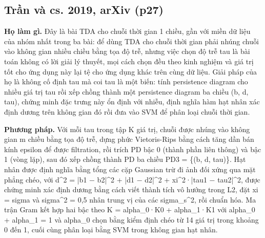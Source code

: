 \documentclass[12pt,a4paper]{article}
\begin{document}
\subsection{Trần và cs. 2019, arXiv \normalfont\small (p27)}
\par\vspace{2pt}
\par\vspace{4pt}
\noindent \textbf{Họ làm gì.} Đây là bài TDA cho chuỗi thời gian 1 chiều, gần với miền dữ liệu của nhóm nhất trong ba bài: để dùng TDA cho chuỗi thời gian phải nhúng chuỗi vào không gian nhiều chiều bằng tọa độ trễ, nhưng việc chọn độ trễ tau là bài toán không có lời giải lý thuyết, mọi cách chọn đều theo kinh nghiệm và giá trị tốt cho ứng dụng này lại tệ cho ứng dụng khác trên cùng dữ liệu. Giải pháp của họ là không cố định tau mà coi tau là một biến: tính persistence diagram cho nhiều giá trị tau rồi xếp chồng thành một persistence diagram ba chiều (b, d, tau), chứng minh đặc trưng này ổn định với nhiễu, định nghĩa hàm hạt nhân xác định dương trên không gian đó rồi đưa vào SVM để phân loại chuỗi thời gian.\par\vspace{3pt}
\noindent \textbf{Phương pháp.} Với mỗi tau trong tập K giá trị, chuỗi được nhúng vào không gian m chiều bằng tọa độ trễ, dựng phức Vietoris-Rips bằng cách tăng dần bán kính epsilon để được filtration, rồi trích PD bậc 0 (thành phần liên thông) và bậc 1 (vòng lặp), sau đó xếp chồng thành PD ba chiều PD3 = \{(b, d, tau)\}. Hạt nhân được định nghĩa bằng tổng các cặp Gaussian trừ đi ảnh đối xứng qua mặt phẳng chéo, với d\textasciicircum{}2 = |b1 − b2|\textasciicircum{}2 + |d1 − d2|\textasciicircum{}2 + xi\textasciicircum{}2·|tau1 − tau2|\textasciicircum{}2, được chứng minh xác định dương bằng cách viết thành tích vô hướng trong L2, đặt xi = sigma và sigma\textasciicircum{}2 = 0,5 nhân trung vị của các sigma\_s\textasciicircum{}2, rồi chuẩn hóa. Ma trận Gram kết hợp hai bậc theo K = alpha\_0·K0 + alpha\_1·K1 với alpha\_0 + alpha\_1 = 1 và alpha\_0 chọn bằng kiểm định chéo từ 14 giá trị trong khoảng 0 đến 1, cuối cùng phân loại bằng SVM trong không gian hạt nhân.\par\vspace{3pt}
\end{document}
